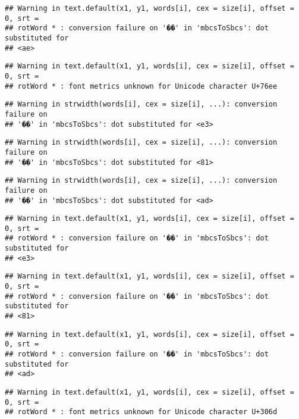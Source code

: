 \documentclass[]{article}
\begin{document}
\begin{verbatim}
## Warning in text.default(x1, y1, words[i], cex = size[i], offset = 0, srt =
## rotWord * : conversion failure on '��' in 'mbcsToSbcs': dot substituted for
## <ae>
\end{verbatim}

\begin{verbatim}
## Warning in text.default(x1, y1, words[i], cex = size[i], offset = 0, srt =
## rotWord * : font metrics unknown for Unicode character U+76ee
\end{verbatim}

\begin{verbatim}
## Warning in strwidth(words[i], cex = size[i], ...): conversion failure on
## '��' in 'mbcsToSbcs': dot substituted for <e3>
\end{verbatim}

\begin{verbatim}
## Warning in strwidth(words[i], cex = size[i], ...): conversion failure on
## '��' in 'mbcsToSbcs': dot substituted for <81>
\end{verbatim}

\begin{verbatim}
## Warning in strwidth(words[i], cex = size[i], ...): conversion failure on
## '��' in 'mbcsToSbcs': dot substituted for <ad>
\end{verbatim}

\begin{verbatim}
## Warning in text.default(x1, y1, words[i], cex = size[i], offset = 0, srt =
## rotWord * : conversion failure on '��' in 'mbcsToSbcs': dot substituted for
## <e3>
\end{verbatim}

\begin{verbatim}
## Warning in text.default(x1, y1, words[i], cex = size[i], offset = 0, srt =
## rotWord * : conversion failure on '��' in 'mbcsToSbcs': dot substituted for
## <81>
\end{verbatim}

\begin{verbatim}
## Warning in text.default(x1, y1, words[i], cex = size[i], offset = 0, srt =
## rotWord * : conversion failure on '��' in 'mbcsToSbcs': dot substituted for
## <ad>
\end{verbatim}

\begin{verbatim}
## Warning in text.default(x1, y1, words[i], cex = size[i], offset = 0, srt =
## rotWord * : font metrics unknown for Unicode character U+306d
\end{verbatim}
\end{document}
